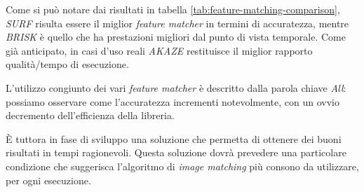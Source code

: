 Come si pu\`o notare dai risultati in tabella \ref{tab:feature-matching-comparison}, \textit{SURF} risulta essere il miglior \textit{feature matcher} in termini di accuratezza, mentre \textit{BRISK} \`e quello che ha prestazioni migliori dal punto di vista temporale. Come gi\`a anticipato, in casi d'uso reali \textit{AKAZE} restituisce il miglior rapporto qualit\`a/tempo di esecuzione.\par
L'utilizzo congiunto dei vari \textit{feature matcher} \`e descritto dalla parola chiave \textit{All}: possiamo osservare come l'accuratezza incrementi notevolmente, con un ovvio decremento dell'efficienza della libreria.\par
\`E tuttora in fase di sviluppo una soluzione che permetta di ottenere dei buoni risultati in tempi ragionevoli. Questa soluzione dovr\`a prevedere una particolare condizione che suggerisca l'algoritmo di \textit{image matching} pi\`u consono da utilizzare, per ogni esecuzione.

